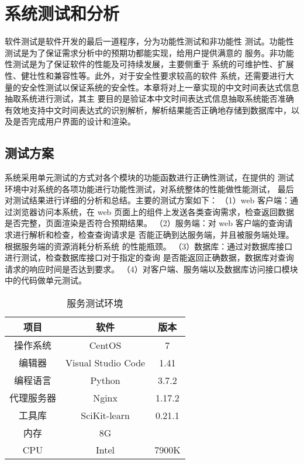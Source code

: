 
\chapter{系统测试和分析}

软件测试是软件开发的最后一道程序，分为功能性测试和非功能性
测试。功能性测试是为了保证需求分析中的预期功都能实现，给用户提供满意的
服务。非功能性测试是为了保证软件的性能及可持续发展，主要侧重于
系统的可维护性、扩展性、健壮性和兼容性等。此外，对于安全性要求较高的软件
系统，还需要进行大量的安全性测试以保证系统的安全性。本章将对上一章实现的中文时间表达式信息抽取系统进行测试，其主
要目的是验证本中文时间表达式信息抽取系统能否准确有效地支持中文时间表达式的识别解析，解析结果能否正确地存储到数据库中，以及是否完成用户界面的设计和渲染。

\section{测试方案}

系统采用单元测试的方式对各个模块的功能函数进行正确性测试，在提供的
测试环境中对系统的各项功能进行功能性测试，对系统整体的性能做性能测试，
最后对测试结果进行详细的分析和总结。主要的测试方案如下：
（1）web 客户端：通过浏览器访问本系统，在 web 页面上的组件上发送各类查询需求，检查返回数据是否完整，页面渲染是否符合预期结果。
（2）服务端：对 web 客户端的查询请求进行解析和检查，检查查询请求是
否能正确到达服务端，并且被服务端处理。根据服务端的资源消耗分析系统
的性能瓶颈。
（3）数据库：通过对数据库接口进行测试，检查数据库接口对于指定的查询
是否能返回正确数据，数据库对查询请求的响应时间是否达到要求。
（4）对客户端、服务端以及数据库访问接口模块中的代码做单元测试。

\begin{table}[h]
    \centering
    \caption{服务测试环境}
    \begin{tabular}{|*{3}{c|}}
        \hline
        项目       & 软件               & 版本   \\
        \hline
        操作系统   & CentOS             & 7      \\
        \hline
        编辑器     & Visual Studio Code & 1.41   \\
        编程语言   & Python             & 3.7.2  \\
        \hline
        代理服务器 & Nginx              & 1.17.2 \\
        \hline
        工具库     & SciKit-learn       & 0.21.1 \\
        \hline
        内存       & 8G                 &        \\
        \hline
        CPU        & Intel              & 7900K  \\
        \hline
    \end{tabular}
    \label{tab:server_test}
\end{table}

